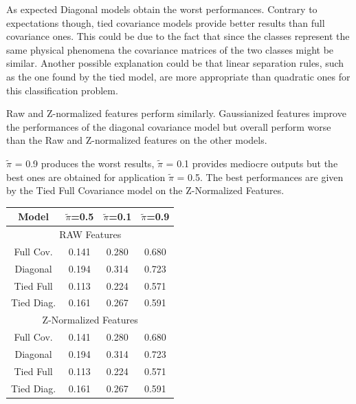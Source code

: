 \documentclass[12pt,a4paper]{article}
\begin{document}
\begin{multicols}{2}
    {

        \begin{addmargin}[0em]{1em}
            As expected Diagonal models obtain the worst performances.
            Contrary to expectations though, tied covariance models provide better results than full covariance ones.
            This could be due to the fact that since the classes represent the same physical phenomena the covariance matrices of the two classes might be similar.
            Another possible explanation could be that linear separation rules, such as the one found by the tied model, are more appropriate than quadratic ones for this classification problem.

            Raw and Z-normalized features perform similarly.
            Gaussianized features improve the performances of the diagonal covariance model but overall perform worse than the Raw and Z-normalized features on the other models.

            \(\tilde{\pi}\) = 0.9 produces the worst results, \(\tilde{\pi}\) = 0.1 provides mediocre outputs but the best ones are obtained for application \(\tilde{\pi}\) = 0.5.
            The best performances are given by the Tied Full Covariance model on the Z-Normalized Features.
        \end{addmargin}
    }
    {
        \noindent
        \renewcommand{\arraystretch}{1.2}
        \begin{tabular}{@{}cccc@{}}
            Model      & \(\tilde{\pi}\)=0.5  & \(\tilde{\pi}\)=0.1   & \(\tilde{\pi}\)=0.9  \\ [0.5ex]

            \hline
            \multicolumn{4}{c}{RAW Features}                                                 \\
            \hline
            Full Cov.  & 0.141                & 0.280                 & 0.680                \\
            Diagonal   & 0.194                & 0.314                 & 0.723                \\
            Tied Full  & {\color{red} 0.113 } & {\color{red} 0.224 }  & 0.571                \\
            Tied Diag. & 0.161                & 0.267                 & 0.591                \\

            \hline
            \multicolumn{4}{c}{Z-Normalized Features}                                        \\
            \hline
            Full Cov.  & 0.141                & 0.280                 & 0.680                \\
            Diagonal   & 0.194                & 0.314                 & 0.723                \\
            Tied Full  & {\color{red} 0.113 } & {\color{red} 0.224 }  & 0.571                \\
            Tied Diag. & 0.161                & 0.267                 & 0.591                \\


\end{tabular}}
\end{multicols}
\end{document}

